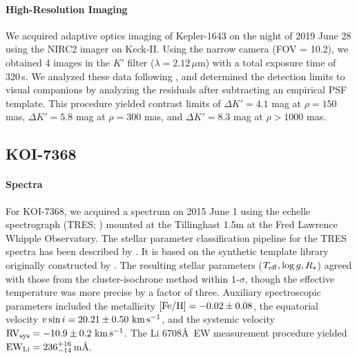 \documentclass[12pt,twocolumn,linenumbers]{aastex63}
\newcommand{\mkms}{{\rm \,km\,s^{-1}}}  %
\begin{document}

\paragraph{High-Resolution Imaging}
We acquired adaptive optics imaging of Kepler-1643 on the night of
2019 June 28 using the NIRC2 imager on Keck-II.
Using the narrow camera (FOV = 10.2\arcsec), we obtained 4 images in
the $K'$ filter ($\lambda = 2.12\,\mu$m) with a total exposure time of
320\,s. We analyzed these data following \citet{kraus_impact_2016},
and determined the detection limits to visual companions by analyzing
the residuals after subtracting an empirical PSF template. 
This procedure yielded contrast limits of $\Delta K' = 4.1$ mag at
$\rho = 150$ mas, $\Delta K' = 5.8$ mag at $\rho = 300$ mas, and
$\Delta K' = 8.3$ mag at $\rho > 1000$ mas.


\subsection{KOI-7368}
\paragraph{Spectra}
For KOI-7368, we acquired a spectrum on 2015 June 1 using the echelle
spectrograph (TRES; \citealt{furesz_tres_2008}) mounted at the
Tillinghast 1.5m at the Fred Lawrence Whipple Observatory.
The stellar parameter classification pipeline for the
TRES spectra has been described by \citet{2021tsc2.confE.124B}.  It is
based on the synthetic template library originally constructed by
\citet{buchhave_hatp16b_class_2010}.  The resulting stellar parameters
($T_{\rm eff}, \log g, R_\star$) agreed with those from the
cluster-isochrone method within $1$-$\sigma$, though the effective
temperature was more precise by a factor of three.  Auxiliary
spectroscopic parameters included the metallicity $[{\rm Fe/H}]= -0.02
\pm 0.08$, the equatorial velocity $v\sin i = 20.21 \pm 0.50\,\mkms$,
and the systemic velocity ${\rm RV}_{\rm sys} = -10.9 \pm 0.2\,\mkms$.
The Li 6708\AA\ EW measurement procedure yielded ${\rm EW}_{\rm Li} =
236^{+16}_{-14}$\,m\AA.
\end{document}
